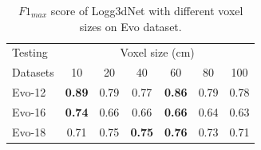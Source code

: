 \begin{table}[htbp]
  \centering
  \small
  \begin{tabular}{p{2cm} *{6}{c}}
      \toprule
      \multicolumn{1}{l}{Testing} & \multicolumn{6}{c}{Voxel size (cm)} \\
      \cmidrule{2-7}
      \multicolumn{1}{l}{Datasets} & 10 & 20 & 40 & 60 & 80 & 100 \\
      \midrule
      Evo-12 &\textbf{0.89} &0.79 &0.77 &\textbf{0.86} &0.79 &0.78 \\
      \addlinespace %
      Evo-16 & \textbf{0.74} & 0.66 & 0.66 & \textbf{0.66} & 0.64 & 0.63 \\
      \addlinespace %
      Evo-18  &0.71 & 0.75 & \textbf{0.75} & \textbf{0.76} & 0.73 & 0.71 \\
      \bottomrule
  \end{tabular}

  \caption{$F{1}_{max}$ score of Logg3dNet with different voxel sizes on Evo dataset. }
  \label{tab:voxel_size}
\end{table}

  

